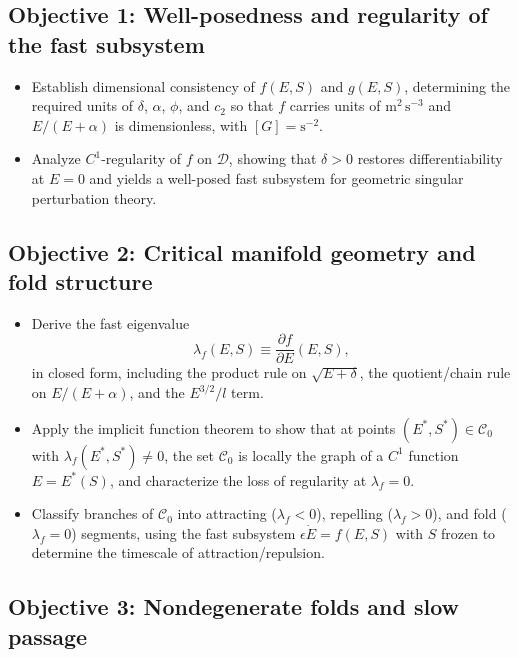 \documentclass[11pt,fleqn]{article}
\begin{document}
\subsection{Objective 1: Well-posedness and regularity of the fast subsystem}

\begin{itemize}
    \item Establish dimensional consistency of $f(E,S)$ and $g(E,S)$, determining
    the required units of $\delta$, $\alpha$, $\phi$, and $c_2$ so that
    $f$ carries units of $\mathrm{m}^2\,\mathrm{s}^{-3}$ and $E/(E+\alpha)$ is
    dimensionless, with $[G] = \mathrm{s}^{-2}$.
    \item Analyze $C^1$-regularity of $f$ on $\mathcal{D}$, showing that
    $\delta>0$ restores differentiability at $E=0$ and yields a well-posed fast
    subsystem for geometric singular perturbation theory.
\end{itemize}

\subsection{Objective 2: Critical manifold geometry and fold structure}

\begin{itemize}
    \item Derive the fast eigenvalue
    \begin{equation}
        \lambda_f(E,S) \equiv \frac{\partial f}{\partial E}(E,S),
    \end{equation}
    in closed form, including the product rule on $\sqrt{E+\delta}$, the
    quotient/chain rule on $E/(E+\alpha)$, and the $E^{3/2}/l$ term.
    \item Apply the implicit function theorem to show that at points
    $(E^*,S^*) \in \mathcal{C}_0$ with $\lambda_f(E^*,S^*) \neq 0$, the set
    $\mathcal{C}_0$ is locally the graph of a $C^1$ function $E = E^*(S)$, and
    characterize the loss of regularity at $\lambda_f=0$.
    \item Classify branches of $\mathcal{C}_0$ into attracting ($\lambda_f<0$),
    repelling ($\lambda_f>0$), and fold ($\lambda_f=0$) segments, using the fast
    subsystem $\epsilon \dot E = f(E,S)$ with $S$ frozen to determine the
    timescale of attraction/repulsion.
\end{itemize}

\subsection{Objective 3: Nondegenerate folds and slow passage}
\end{document}
